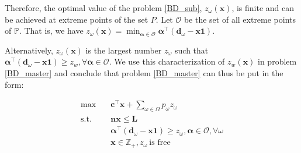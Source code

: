 Therefore, the optimal value of the problem \eqref{BD_sub}, $z_{\omega}(\mathbf{x})$, is finite and can be achieved at extreme points of the set $P$. Let $\mathcal{O}$ be the set of all extreme points of $\mathbb{P}$. That is, we have $z_{\omega}(\mathbf{x}) = \min_{\bm{\alpha} \in \mathcal{O}} \bm{\alpha}^{\intercal}(\mathbf{d}_{\omega}- \mathbf{x} \mathbf{1})$.




Alternatively, $z_{\omega}(\mathbf{x})$ is the largest number $z_{\omega}$ such that $\bm{\alpha}^{\intercal}(\mathbf{d}_{\omega}- \mathbf{x} \mathbf{1}) \geq z_w, \forall \bm{\alpha} \in \mathcal{O}$. We use this characterization of $z_w(\mathbf{x})$ in problem \eqref{BD_master} and conclude that problem \eqref{BD_master} can thus be put in the form:

\begin{equation}\label{BD_master2}
  \begin{aligned}
    \max \quad & \mathbf{c}^{\intercal} \mathbf{x} + \sum_{\omega \in \Omega} p_{\omega} z_{\omega} \\
    \text {s.t.} \quad & \mathbf{n} \mathbf{x} \leq \mathbf{L} \\
    & \bm{\alpha}^{\intercal}(\mathbf{d}_{\omega}- \mathbf{x} \mathbf{1}) \geq z_{\omega}, \bm{\alpha} \in \mathcal{O}, \forall \omega \\
     & \mathbf{x} \in \mathbb{Z}_{+}, z_{\omega} ~\text{is free}
  \end{aligned}
\end{equation}



